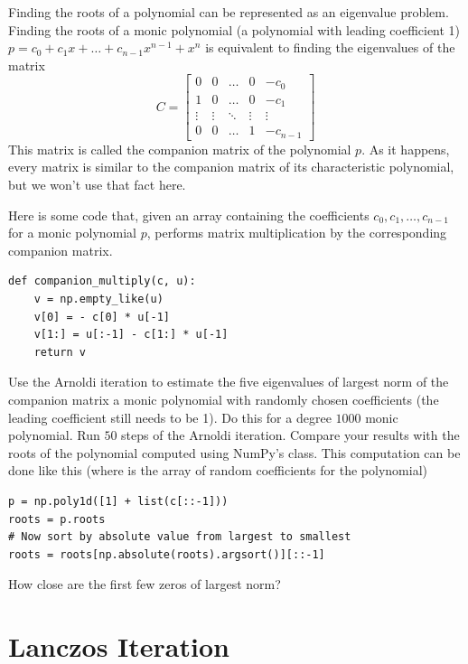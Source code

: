 \begin{problem}
Finding the roots of a polynomial can be represented as an eigenvalue problem.
Finding the roots of a monic polynomial (a polynomial with leading coefficient 1) $p = c_0 + c_1 x + \dots + c_{n-1} x^{n-1} + x^n$ is equivalent to finding the eigenvalues of the matrix
\[C = \begin{bmatrix}
0 & 0 & \dots & 0 & -c_0 \\
1 & 0 & \dots & 0 & -c_1 \\
\vdots & \vdots & \ddots & \vdots & \vdots \\
0 & 0 & \dots & 1 & -c_{n-1} \end{bmatrix}\]
This matrix is called the companion matrix of the polynomial $p$.
As it happens, every matrix is similar to the companion matrix of its characteristic polynomial, but we won't use that fact here.

Here is some code that, given an array containing the coefficients $c_0, c_1, \dots, c_{n-1}$ for a monic polynomial $p$, performs matrix multiplication by the corresponding companion matrix.
\begin{lstlisting}
def companion_multiply(c, u):
    v = np.empty_like(u)
    v[0] = - c[0] * u[-1]
    v[1:] = u[:-1] - c[1:] * u[-1]
    return v
\end{lstlisting}

Use the Arnoldi iteration to estimate the five eigenvalues of largest norm of the companion matrix a monic polynomial with randomly chosen coefficients (the leading coefficient still needs to be 1).
Do this for a degree $1000$ monic polynomial.
Run $50$ steps of the Arnoldi iteration.
Compare your results with the roots of the polynomial computed using NumPy's  class.
This computation can be done like this (where  is the array of random coefficients for the polynomial)
\begin{lstlisting}
p = np.poly1d([1] + list(c[::-1]))
roots = p.roots
# Now sort by absolute value from largest to smallest
roots = roots[np.absolute(roots).argsort()][::-1]
\end{lstlisting}
How close are the first few zeros of largest norm?
\end{problem}

\section*{Lanczos Iteration}

